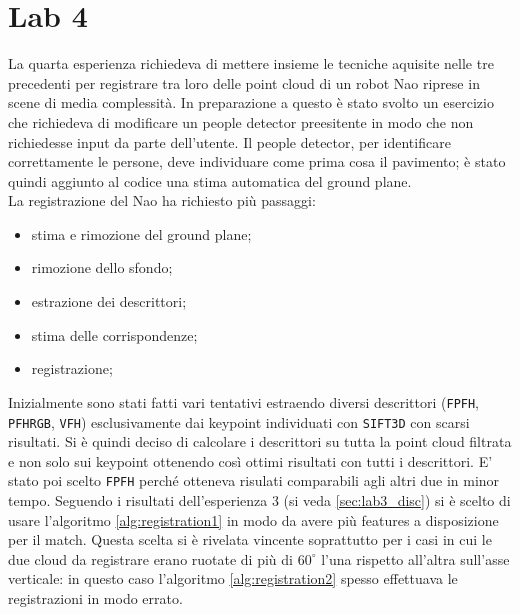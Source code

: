 \documentclass[a4paper]{article}
\begin{document}
\section{Lab 4} \label{sec:lab4}
La quarta esperienza richiedeva di mettere insieme le tecniche aquisite nelle tre precedenti per registrare tra loro delle point cloud di un robot Nao riprese in scene di media complessità. In preparazione a questo è stato svolto un esercizio che richiedeva di modificare un people detector preesitente in modo che non richiedesse input da parte dell'utente. Il people detector, per identificare correttamente le persone, deve individuare come prima cosa il pavimento; è stato quindi aggiunto al codice una stima automatica del ground plane.\\
La registrazione del Nao ha richiesto più passaggi:
\begin{itemize}
	\item stima e rimozione del ground plane;
	\item rimozione dello sfondo;
	\item estrazione dei descrittori;
	\item stima delle corrispondenze;
	\item registrazione;
\end{itemize}
Inizialmente sono stati fatti vari tentativi estraendo diversi descrittori (\verb|FPFH|, \verb|PFHRGB|, \verb|VFH|) esclusivamente dai keypoint individuati con \verb|SIFT3D| con scarsi risultati. Si è quindi deciso di calcolare i descrittori su tutta la point cloud filtrata e non solo sui keypoint ottenendo così ottimi risultati con tutti i descrittori. E' stato poi scelto \verb|FPFH| perché otteneva risulati comparabili agli altri due in minor tempo. Seguendo i risultati dell'esperienza 3 (si veda \ref{sec:lab3_disc}) si è scelto di usare l'algoritmo \ref{alg:registration1} in modo da avere più features a disposizione per il match. Questa scelta si è rivelata vincente soprattutto per i casi in cui le due cloud da registrare erano ruotate di più di $60^\circ$ l'una rispetto all'altra sull'asse verticale: in questo caso l'algoritmo \ref{alg:registration2} spesso effettuava le registrazioni in modo errato.
\end{document}
